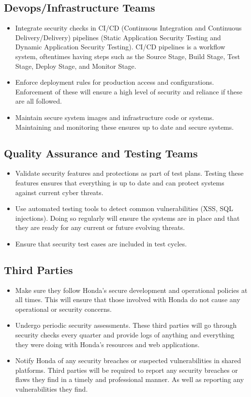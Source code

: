 \subsection{Devops/Infrastructure Teams}
\begin{itemize}
    \item Integrate security checks in CI/CD (Continuous Integration and Continuous Delivery/Delivery) pipelines (Static Application Security Testing and Dynamic Application Security Testing). CI/CD pipelines is a workflow system, oftentimes having steps such as the Source Stage, Build Stage, Test Stage, Deploy Stage, and Monitor Stage.
    \item Enforce deployment rules for production access and configurations. Enforcement of these will ensure a high level of security and reliance if these are all followed. 
    \item Maintain secure system images and infrastructure code or systems. Maintaining and monitoring these ensures up to date and secure systems.
\end{itemize}
\subsection{Quality Assurance and Testing Teams}
\begin{itemize}
    \item Validate security features and protections as part of test plans. Testing these features ensures that everything is up to date and can protect systems against current cyber threats.
    \item Use automated testing tools to detect common vulnerabilities (XSS, SQL injections). Doing so regularly will ensure the systems are in place and that they are ready for any current or future evolving threats.
    \item Ensure that security test cases are included in test cycles.
\end{itemize}
\subsection{Third Parties}
\begin{itemize}
    \item Make sure they follow Honda's secure development and operational policies at all times. This will ensure that those involved with Honda do not cause any operational or security concerns.
    \item Undergo periodic security assessments. These third parties will go through security checks every quarter and provide logs of anything and everything they were doing with Honda’s resources and web applications. 
    \item Notify Honda of any security breaches or suspected vulnerabilities in shared platforms. Third parties will be required to report any security breaches or flaws they find in a timely and professional manner. As well as reporting any vulnerabilities they find.
\end{itemize}
